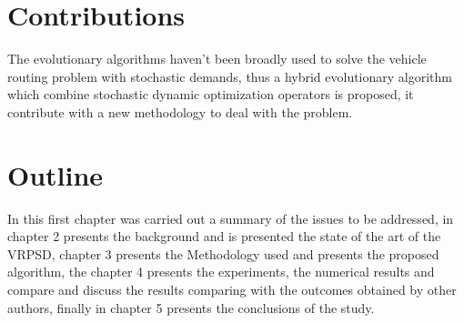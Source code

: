 \section{Contributions}

The evolutionary algorithms haven't been broadly used to solve the vehicle routing problem with stochastic demands, thus a hybrid evolutionary algorithm which combine stochastic dynamic optimization operators is proposed, it contribute with a new methodology to deal with the problem.

\section{Outline}

In this first chapter was carried out a summary of the issues to be addressed, in chapter 2 presents the background and is presented the state of the art of the VRPSD, chapter 3 presents the Methodology used and presents the proposed algorithm, the chapter 4 presents the experiments, the numerical results and compare and discuss the results comparing with the outcomes obtained by other authors, finally in chapter 5 presents the conclusions of the study.

